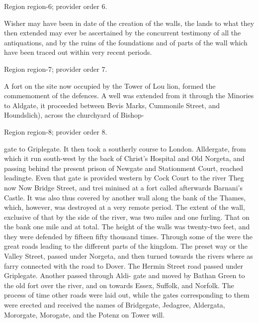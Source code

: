 \documentclass[11pt]{article}
\begin{document}
{\scriptsize\color{gray} Region region-6; provider order 6.\par}
\medskip

Wisher may have been in date of the creation of the walls, the lands to what they then extended may ever be ascertained by the concurrent testimony of all the antiquations, and by the ruins of the foundations and of parts of the wall which have been traced out within very recent periods.
\par

{\scriptsize\color{gray} Region region-7; provider order 7.\par}
\medskip

A fort on the site now occupied by the Tower of Lou lion, formed the commemoment of the defences. A well was extended from it through the Minories to Aldgate, it proceeded between Bevis Marks, Cummonile Street, and Houndslich), across the churchyard of Bishop-
\par

{\scriptsize\color{gray} Region region-8; provider order 8.\par}
\medskip

gate to Griplegate. It then took a southerly course to London. Alldergate, from which it run south-west by the back of Christ's Hospital and Old Norgeta, and passing behind the present prison of Newgate and Stationment Court, reached leadingte. Even that gate is provided western by Cock Court to the river Theg now Now Bridge Street, and trei minined at a fort called afterwards Barnani’s Castle. It was also thus covered by another wall along the bank of the Thames, which, however, was destroyed at a very remote period. The extent of the wall, exclusive of that by the side of the river, was two miles and one furling. That on the bank one mile and at total. The height of the walls was twenty-two feet, and they were defended by fifteen fifty thousand times. Through some of the were the great roads leading to the different parts of the kingdom. The preset way or the Valley Street, passed under Norgeta, and then turned towards the rivers where as farry connected with the road to Dover. The Hermin Street road passed under Griplegate. Another passed through Aldi- gate and moved by Bathan Green to the old fort over the river, and on towards Essex, Suffolk, and Norfolk. The process of time other roads were laid out, while the gates corresponding to them were erected and received the names of Bridgegate, Jedagree, Aldergata, Mororgate, Morogate, and the Potenz on Tower will.
\par
\end{document}
